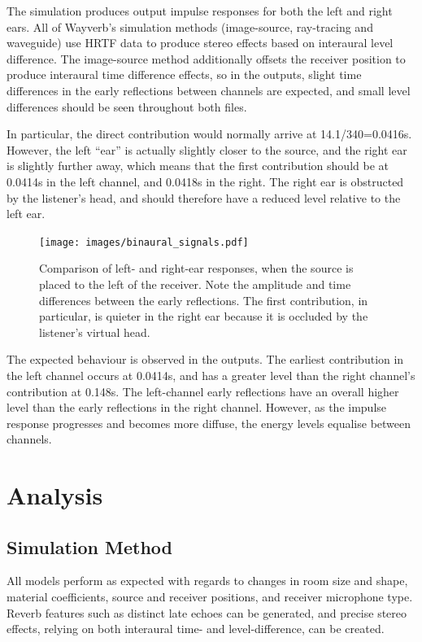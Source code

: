 \documentclass[]{scrreprt}
\begin{document}
The simulation produces output impulse responses for both the left and
right ears. All of Wayverb's simulation methods (image-source,
ray-tracing and waveguide) use HRTF data to produce stereo effects based
on interaural level difference. The image-source method additionally
offsets the receiver position to produce interaural time difference
effects, so in the outputs, slight time differences in the early
reflections between channels are expected, and small level differences
should be seen throughout both files.

In particular, the direct contribution would normally arrive at
14.1/340=0.0416s. However, the left ``ear'' is actually slightly closer
to the source, and the right ear is slightly further away, which means
that the first contribution should be at 0.0414s in the left channel,
and 0.0418s in the right. The right ear is obstructed by the listener's
head, and should therefore have a reduced level relative to the left
ear.

\begin{figure}[htbp]
\centering
\texttt{[image: images/binaural\_signals.pdf]}
\caption{Comparison of left- and right-ear responses, when the source is
placed to the left of the receiver. Note the amplitude and time
differences between the early reflections. The first contribution, in
particular, is quieter in the right ear because it is occluded by the
listener's virtual head.}
\end{figure}

The expected behaviour is observed in the outputs. The earliest
contribution in the left channel occurs at 0.0414s, and has a greater
level than the right channel's contribution at 0.148s. The left-channel
early reflections have an overall higher level than the early
reflections in the right channel. However, as the impulse response
progresses and becomes more diffuse, the energy levels equalise between
channels.

\section{Analysis}\label{analysis}

\subsection{Simulation Method}\label{simulation-method}

All models perform as expected with regards to changes in room size and
shape, material coefficients, source and receiver positions, and
receiver microphone type. Reverb features such as distinct late echoes
can be generated, and precise stereo effects, relying on both interaural
time- and level-difference, can be created.
\end{document}
